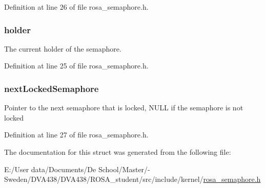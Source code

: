 Definition at line 26 of file rosa\+\_\+semaphore.\+h.

\hypertarget{struct_r_o_s_a__semaphore_handle__record__t_a461b405005227346258d6b3d1f4310f1}{}
\subsubsection[{holder}]{\setlength{\rightskip}{0pt plus 5cm}holder}\label{struct_r_o_s_a__semaphore_handle__record__t_a461b405005227346258d6b3d1f4310f1}
The current holder of the semaphore. 

Definition at line 25 of file rosa\+\_\+semaphore.\+h.

\hypertarget{struct_r_o_s_a__semaphore_handle__record__t_a01c07bcd84183693c57dc655f1cf8cb5}{}
\subsubsection[{next\+Locked\+Semaphore}]{\setlength{\rightskip}{0pt plus 5cm}next\+Locked\+Semaphore}\label{struct_r_o_s_a__semaphore_handle__record__t_a01c07bcd84183693c57dc655f1cf8cb5}
Pointer to the next semaphore that is locked, N\+U\+L\+L if the semaphore is not locked 

Definition at line 27 of file rosa\+\_\+semaphore.\+h.



The documentation for this struct was generated from the following file\+:\begin{DoxyCompactItemize}
\item 
E\+:/\+User data/\+Documents/\+De School/\+Master/-\/ Sweden/\+D\+V\+A438/\+D\+V\+A438/\+R\+O\+S\+A\+\_\+student/src/include/kernel/\hyperlink{rosa__semaphore_8h}{rosa\+\_\+semaphore.\+h}\end{DoxyCompactItemize}
